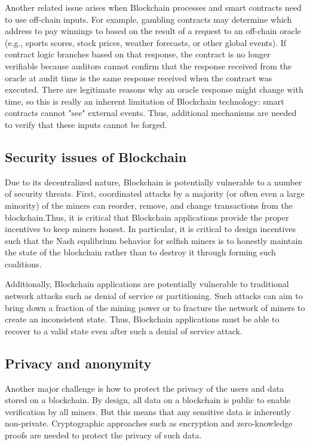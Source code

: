 Another related issue arises when Blockchain processes and smart contracts need to use off-chain inputs.  For example, gambling contracts may determine which address to pay winnings to based on the result of a request to an off-chain oracle (e.g., sports scores, stock prices, weather forecasts, or other global events). If contract logic branches based on that response, the contract is no longer verifiable because auditors cannot confirm that the response received from the oracle at audit time is the same response received when the contract was executed. There are legitimate reasons why an oracle response might change with time, so this is really an inherent limitation of Blockchain technology: smart contracts cannot "see" external events.  Thus, additional mechanisms are needed to verify that these inputs cannot be forged.

\subsection{Security issues of Blockchain}
Due to its decentralized nature, Blockchain is potentially vulnerable to a number of security threats.  First, coordinated attacks by a majority (or often even a large minority) of the miners can reorder, remove, and change transactions from the blockchain.Thus, it is critical that Blockchain applications provide the proper incentives to keep miners honest.  In particular, it is critical to design incentives such that the Nash equlibrium behavior for selfish miners is to honestly maintain the state of the blockchain rather than to destroy it through forming such coalitions.

Additionally, Blockchain applications are potentially vulnerable to traditional network attacks such as denial of service or partitioning.  Such attacks can aim to bring down a fraction of the mining power or to fracture the network of miners to create an inconsistent state.  Thus, Blockchain applications must be able to recover to a valid state even after such a denial of service attack.

\subsection{Privacy and anonymity}
Another major challenge is how to protect the privacy of the users and data stored on a blockchain.  By design, all data on a blockchain is public to enable verification by all miners.  But this means that any sensitive data is inherently non-private.  Cryptographic approaches such as encryption and zero-knowledge proofs are needed to protect the privacy of such data.

